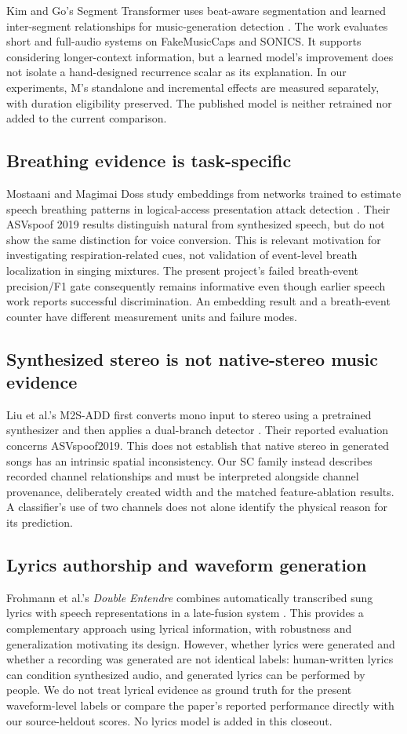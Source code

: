 Kim and Go's Segment Transformer uses beat-aware segmentation and learned
inter-segment relationships for music-generation detection
\cite{kim2025}. The work evaluates short and full-audio systems on
FakeMusicCaps and SONICS. It supports considering longer-context information,
but a learned model's improvement does not isolate a hand-designed recurrence
scalar as its explanation. In our experiments, M's standalone and incremental
effects are measured separately, with duration eligibility preserved. The
published model is neither retrained nor added to the current comparison.

\subsection{Breathing evidence is task-specific}
Mostaani and Magimai Doss study embeddings from networks trained to estimate
speech breathing patterns in logical-access presentation attack detection
\cite{mostaani2022}. Their ASVspoof 2019 results distinguish natural from
synthesized speech, but do not show the same distinction for voice conversion.
This is relevant motivation for investigating respiration-related cues, not
validation of event-level breath localization in singing mixtures. The
present project's failed breath-event precision/F1 gate consequently remains
informative even though earlier speech work reports successful discrimination.
An embedding result and a breath-event counter have different measurement
units and failure modes.

\subsection{Synthesized stereo is not native-stereo music evidence}
Liu et al.'s M2S-ADD first converts mono input to stereo using a pretrained
synthesizer and then applies a dual-branch detector \cite{liu2023}. Their
reported evaluation concerns ASVspoof2019. This does not establish that
native stereo in generated songs has an intrinsic spatial inconsistency.
Our SC family instead describes recorded channel relationships and must be
interpreted alongside channel provenance, deliberately created width and
the matched feature-ablation results. A classifier's use of two channels
does not alone identify the physical reason for its prediction.

\subsection{Lyrics authorship and waveform generation}
Frohmann et al.'s \emph{Double Entendre} combines automatically transcribed
sung lyrics with speech representations in a late-fusion system
\cite{frohmann2025}. This provides a complementary approach using lyrical
information, with robustness and generalization motivating its design.
However, whether lyrics were generated and whether a recording was generated
are not identical labels: human-written lyrics can condition synthesized
audio, and generated lyrics can be performed by people. We do not treat
lyrical evidence as ground truth for the present waveform-level labels or
compare the paper's reported performance directly with our source-heldout
scores. No lyrics model is added in this closeout.

